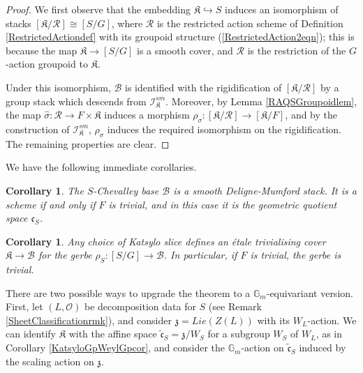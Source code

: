 \documentclass{amsart}
\newtheorem{corollary}[theorem]{Corollary}
\theoremstyle{remark}
\numberwithin{theorem}{section}
\numberwithin{equation}{section}
\begin{document}
 \begin{proof}
 We first observe that the embedding $\mathfrak{K} \hookrightarrow S$ induces an isomorphism of stacks $[\mathfrak{K}/\mathcal R] \cong [S/G]$, where $\mathcal R$ is the restricted action scheme of Definition \ref{RestrictedActiondef} with its groupoid structure (\ref{RestrictedAction2eqn}); this is because the map $\mathfrak{K} \rightarrow [S/G]$ is a smooth cover, and $\mathcal R$ is the restriction of the $G$-action groupoid to $\mathfrak{K}$.

Under this isomorphism, $\mathcal B$ is identified with the rigidification of $[\mathfrak{K}/\mathcal R]$ by a group stack which descends from $\mathcal I_\mathfrak{K}^{sm}$. Moreover, by Lemma \ref{RAQSGroupoidlem}, the map $\hat{\sigma}:\mathcal R \rightarrow F \times \mathfrak{K}$ induces a morphism $\rho_{\sigma}:[\mathfrak{K}/\mathcal R] \rightarrow [\mathfrak{K}/F]$, and by the construction of $\mathcal I_{\mathfrak{K}}^{sm}$, $\rho_\sigma$ induces the required isomorphism on the rigidification.  The remaining properties are clear. 
\end{proof}

We have the following immediate corollaries.

\begin{corollary}\label{StackyCBSmDMcor}
    The $S$-Chevalley base $\mathcal B$ is a smooth Deligne-Mumford stack. It is a scheme if and only if $F$ is trivial, and in this case it is the geometric quotient space $\mathfrak{c}_S$.
\end{corollary}

\begin{corollary}\label{GerbeTrivncor}
    Any choice of Katsylo slice defines an \'{e}tale trivialising cover $\mathfrak{K} \rightarrow \mathcal B$ for the gerbe $\rho_S:[S/G]\rightarrow \mathcal B$. In particular, if $F$ is trivial, the gerbe is trivial.
\end{corollary}

There are two possible ways to upgrade the theorem to a $\mathbb{G}_m$-equivariant version. First, let $(L, \mathcal O)$ be decomposition data for $S$ (see Remark \ref{SheetClassificationrmk}), and consider $\mathfrak{z} = Lie(Z(L))$ with its $W_L$-action. We can identify $\mathfrak{K}$ with the affine space $\tilde{\mathfrak{c}}_S = \mathfrak{z}/W_S$ for a subgroup $W_S$ of $W_L$, as in Corollary \ref{KatsyloGpWeylGpcor}, and consider the $\mathbb{G}_m$-action on $\tilde{\mathfrak{c}}_S$ induced by the scaling action on $\mathfrak{z}$.
\end{document}
